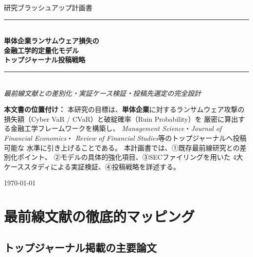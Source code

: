 \documentclass[a4paper,11pt]{article}
\theoremstyle{definition}
\begin{document}
\begin{titlepage}
  \centering
  \vspace*{15mm}
  {\large\color{DarkGray}研究ブラッシュアップ計画書}\\[5mm]
  {\color{NavyBlue}\rule{\linewidth}{1.5pt}}\\[4mm]
  {\LARGE\bfseries\color{NavyBlue}
    単体企業ランサムウェア損失の\\[3mm]
    金融工学的定量化モデル\\[3mm]
    トップジャーナル投稿戦略
  }\\[4mm]
  {\color{SteelBlue}\rule{\linewidth}{0.8pt}}\\[5mm]
  {\large\itshape\color{SteelBlue}
    最前線文献との差別化・実証ケース検証・投稿先選定の完全設計
  }\\[10mm]

  \begin{tcolorbox}[notebox, width=0.92\linewidth]
    \small\setlength{\parskip}{4pt}
    \textbf{本文書の位置付け：}
    本研究の目標は、\textbf{単体企業}に対するランサムウェア攻撃の
    損失額（Cyber VaR / CVaR）と破綻確率（Ruin Probability）を
    厳密に算出する金融工学フレームワークを構築し、
    \textit{Management Science}・\textit{Journal of Financial Economics}・
    \textit{Review of Financial Studies}等のトップジャーナルへ投稿可能な
    水準に引き上げることである。
    本計画書では、①既存最前線研究との差別化ポイント、
    ②モデルの具体的強化項目、③SECファイリングを用いた
    4大ケーススタディによる実証検証、④投稿戦略を詳述する。
  \end{tcolorbox}

  \vfill
  {\color{DarkGray}\small \today}
  \restoregeometry
\end{titlepage}

\tableofcontents
\thispagestyle{empty}
\newpage

\section{最前線文献の徹底的マッピング}
\label{sec:literature}

\subsection{トップジャーナル掲載の主要論文}
\end{document}
